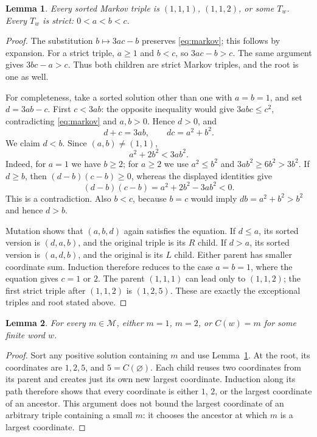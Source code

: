 \documentclass[11pt]{article}
\newtheorem{lemma}{Lemma}
\begin{document}
\begin{lemma}\label{lem:coverage}
Every sorted Markov triple is $(1,1,1)$, $(1,1,2)$, or some $T_w$.
Every $T_w$ is strict: $0<a<b<c$.
\end{lemma}
\begin{proof}
The substitution $b\mapsto3ac-b$ preserves \eqref{eq:markov}; this
follows by expansion. For a strict triple, $a\ge1$ and $b<c$, so
$3ac-b>c$. The same argument gives $3bc-a>c$. Thus both children
are strict Markov triples, and the root is one as well.

For completeness, take a sorted solution other than one with
$a=b=1$, and set $d=3ab-c$. First $c<3ab$: the opposite inequality
would give $3abc\le c^2$, contradicting \eqref{eq:markov} and
$a,b>0$. Hence $d>0$, and
\[
 d+c=3ab,\qquad dc=a^2+b^2.
\]
We claim $d<b$. Since $(a,b)\ne(1,1)$,
\begin{equation}\label{eq:negative}
 a^2+2b^2<3ab^2.
\end{equation}
Indeed, for $a=1$ we have $b\ge2$; for $a\ge2$ we use
$a^2\le b^2$ and $3ab^2\ge6b^2>3b^2$. If $d\ge b$, then
$(d-b)(c-b)\ge0$, whereas the displayed identities give
\[
 (d-b)(c-b)=a^2+2b^2-3ab^2<0.
\]
This is a contradiction. Also $b<c$, because $b=c$ would imply
$db=a^2+b^2>b^2$ and hence $d>b$.

Mutation shows that $(a,b,d)$ again satisfies the equation. If
$d\le a$, its sorted version is $(d,a,b)$, and the original triple
is its $R$ child. If $d>a$, its sorted version is $(a,d,b)$, and the
original is its $L$ child. Either parent has smaller coordinate sum.
Induction therefore reduces to the case $a=b=1$, where the equation
gives $c=1$ or $2$. The parent $(1,1,1)$ can lead only to $(1,1,2)$;
the first strict triple after $(1,1,2)$ is $(1,2,5)$.
These are exactly the exceptional triples and root stated above.
\end{proof}

\begin{lemma}\label{lem:birth}
For every $m\in\mathcal M$, either $m=1$, $m=2$, or $C(w)=m$ for
some finite word $w$.
\end{lemma}
\begin{proof}
Sort any positive solution containing $m$ and use
Lemma~\ref{lem:coverage}. At the root, its coordinates are $1,2,5$,
and $5=C(\varnothing)$. Each child reuses two coordinates from its
parent and creates just its own new largest coordinate. Induction
along its path therefore shows that every coordinate is either
$1$, $2$, or the largest coordinate of an ancestor. This argument
does not bound the largest coordinate of an arbitrary triple
containing a small $m$: it chooses the ancestor at which $m$ is a
largest coordinate.
\end{proof}
\end{document}
